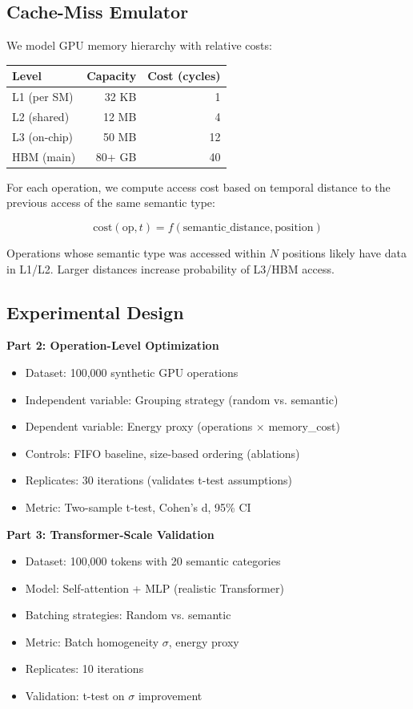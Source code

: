 \documentclass[11pt,twocolumn]{article}
\begin{document}
\subsection{Cache-Miss Emulator}

We model GPU memory hierarchy with relative costs:
\begin{table}[h]
\centering
\begin{tabular}{lrr}
\toprule
Level & Capacity & Cost (cycles) \\
\midrule
L1 (per SM) & 32 KB & 1 \\
L2 (shared) & 12 MB & 4 \\
L3 (on-chip) & 50 MB & 12 \\
HBM (main) & 80+ GB & 40 \\
\bottomrule
\end{tabular}
\end{table}

\noindent
For each operation, we compute access cost based on temporal distance to the previous access of the same semantic type:

\begin{equation}
\text{cost}(\text{op}, t) = f(\text{semantic\_distance}, \text{position})
\end{equation}

\noindent
Operations whose semantic type was accessed within $N$ positions likely have data in L1/L2. Larger distances increase probability of L3/HBM access.

\subsection{Experimental Design}

\textbf{Part 2: Operation-Level Optimization}
\begin{itemize}
\item Dataset: 100,000 synthetic GPU operations
\item Independent variable: Grouping strategy (random vs. semantic)
\item Dependent variable: Energy proxy (operations $\times$ memory\_cost)
\item Controls: FIFO baseline, size-based ordering (ablations)
\item Replicates: 30 iterations (validates t-test assumptions)
\item Metric: Two-sample t-test, Cohen's d, 95\% CI
\end{itemize}

\textbf{Part 3: Transformer-Scale Validation}
\begin{itemize}
\item Dataset: 100,000 tokens with 20 semantic categories
\item Model: Self-attention + MLP (realistic Transformer)
\item Batching strategies: Random vs. semantic
\item Metric: Batch homogeneity $\sigma$, energy proxy
\item Replicates: 10 iterations
\item Validation: t-test on $\sigma$ improvement
\end{itemize}
\end{document}
